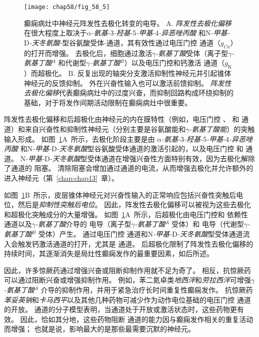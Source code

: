 \begin{figure}[htbp]
	\centering
	\texttt{[image: chap58/fig\_58\_5]}
	\caption{癫痫病灶中神经元阵发性去极化转变的电导。
		A. \textit{阵发性去极化偏移}在很大程度上取决于\textit{$\alpha$-氨基-}3\textit{-羟基-}5\textit{-甲基-}4\textit{-异恶唑丙酸} 和N\textit{-甲基-}D\textit{-天冬氨酸}-型谷氨酸受体-通道，其有效性通过电压门控  通道（$ g_{Ca} $）的打开而增强。
		去极化后，细胞通过激活\textit{$\gamma$-氨基丁酸}受体（离子型\textit{$\gamma$-氨基丁酸}$^A$ 和代谢型\textit{$\gamma$-氨基丁酸}$^B$）以及电压门控和钙激活  通道（$ g_\text{K} $）而超极化\cite{lothman1993neurobiology}。
		B. 反复出现的轴突分支激活抑制性神经元并引起锥体神经元的反馈抑制。
		外在兴奋性输入也可以激活前馈抑制。
		\textit{阵发性去极化偏移}代表癫痫病灶中的过度兴奋，而抑制回路构成环绕抑制的基础，对于将发作间期活动限制在癫痫病灶中很重要。}
	\label{fig:58_5}
\end{figure}


阵发性去极化偏移和后超极化由神经元的内在膜特性（例如，电压门控 、 和  通道）和来自兴奋性和抑制性神经元（分别主要是谷氨酸能和\textit{$\gamma$-氨基丁酸能}）的突触输入形成。
如图~\ref{fig:58_5}A~所示，去极化阶段主要是由 \textit{$\alpha$-氨基-}3\textit{-羟基-}5\textit{-甲基-}4\textit{-异恶唑丙酸} 和N\textit{-甲基-}D\textit{-天冬氨酸}型谷氨酸受体通道的激活引起的，以及电压门控  和  通道。
N\textit{-甲基-}D\textit{-天冬氨酸}型受体通道在增强兴奋性方面特别有效，因为去极化解除了通道的  阻塞。
清除阻塞会增加通过通道的电流，从而增强去极化并允许额外的  进入神经元（第~\ref{chap:chap13}~章）。


如图~\ref{fig:58_5}B~所示，皮层锥体神经元对兴奋性输入的正常响应包括兴奋性突触后电位，然后是\textit{抑制性突触后电位}。
因此，阵发性去极化偏移可以被视为这些去极化和超极化突触成分的大量增强。
如图~\ref{fig:58_5}A~所示，后超极化由电压门控和  依赖性  通道以及\textit{$\gamma$-氨基丁酸}介导的  电导（离子型\textit{$\gamma$-氨基丁酸}$^A$ 受体）和  电导（代谢型\textit{$\gamma$-氨基丁酸}$^B$ 受体）产生。
 通过电压门控  通道和N\textit{-甲基-}D\textit{-天冬氨酸}型受体通道流入会触发钙激活通道的打开，尤其是  通道。
后超极化限制了阵发性去极化偏移的持续时间，其逐渐消失是局灶性癫痫发作的最重要因素，如后所述。


因此，许多惊厥药通过增强兴奋或阻断抑制作用就不足为奇了。
相反，抗惊厥药可以通过阻断兴奋或增强抑制作用。 例如，苯二氮卓类\textit{地西泮}和\textit{劳拉西泮}可增强\textit{$\gamma$-氨基丁酸}$^A$ 介导的抑制作用，并用于紧急治疗长时间重复性癫痫发作。
抗惊厥药\textit{苯妥英钠}和\textit{卡马西平}以及其他几种药物可减少作为动作电位基础的电压门控  通道的开放。
 通道的分子模型表明，当通道处于开放或激活状态时，这些药物更有效。
因此，恰如其分地，这些药物阻断  通道的能力因与癫痫发作相关的重复活动而增强；
也就是说，影响最大的是那些最需要沉默的神经元。



